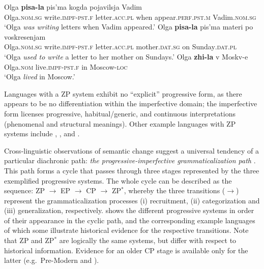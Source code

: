 \documentclass[output=paper,hidelinks]{langscibook}
\begin{document}
\ea\label{ex-rus1}
\gll Olga \textbf{pisa-la} pis'ma kogda pojavilsja Vadim\\
Olga\textsc{.nom.sg} write\textsc{.impf-pst.f} letter\textsc{.acc.pl} when appear\textsc{.perf.pst.m} Vadim\textsc{.nom.sg}\\
\glt `Olga \emph{was writing} letters when Vadim appeared.'
\ex\label{ex-rus2}
\gll Olga \textbf{pisa-la} pis'ma materi po {voskresenjam}\\
Olga\textsc{.nom.sg} write\textsc{.impf-pst.f} letter\textsc{.acc.pl} mother\textsc{.dat.sg} on Sunday\textsc{.dat.pl}\\
\glt `Olga \emph{used to write} a letter to her mother on Sundays.'
\ex\label{ex-rus3}
\gll Olga \textbf{zhi-la} v Moskv-e\\
Olga\textsc{.nom} live\textsc{.impf-pst.f} in Moscow\textsc{-loc}\\
\glt `Olga \emph{lived} in Moscow.'
\z


Languages with a ZP system exhibit no ``explicit'' progressive form, as there appears to be no differentiation within the imperfective domain; the imperfective form licenses progressive, habitual/generic, and continuous interpretations (phenomenal and structural meanings). Other example languages with ZP systems include , , and . 

Cross-linguistic observations of semantic change suggest a universal tendency of a particular diachronic path: \emph{the progressive-imperfective grammaticalization path}  \citep[cf.][]{bybee_1994}. This path forms a cycle that passes through three stages represented by the three exemplified progressive systems.
The whole cycle can be described as the sequence: ZP $\rightarrow$ EP $\rightarrow$ CP $\rightarrow$ ZP$^*$, whereby the three transitions ($\rightarrow$) represent the grammaticalization processes (i) recruitment, (ii) categorization and (iii) generalization, respectively.  shows the different progressive systems in order of their appearance in the cyclic path, and the corresponding example languages of which some illustrate historical evidence for the respective transitions. Note that ZP and ZP$^*$ are logically the same systems, but differ with respect to historical information. Evidence for an older CP stage is available only for the latter (e.g.~Pre-Modern and ).
\end{document}
